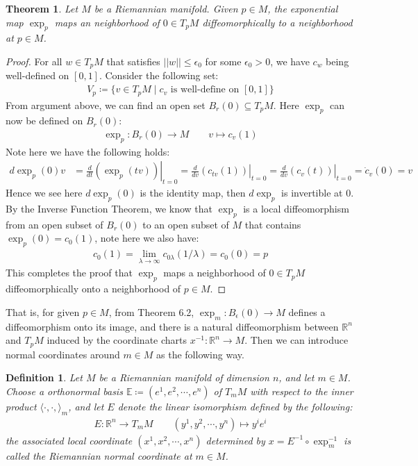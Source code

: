 \documentclass[11pt]{book}
\theoremstyle{break}
\theoremstyle{break}
\newtheorem{thm}{Theorem}[section]
\newtheorem{defn}{Definition}[corL]
\newcommand{\R}{\mathbb{R}}
\begin{document}
\begin{thm}
Let $M$ be a Riemannian manifold. Given $p \in M$, the exponential map $\exp_p$ maps an neighborhood of $0 \in T_pM$ diffeomorphically to a neighborhood at $p \in M$. 
\end{thm}
\begin{proof}
For all $w \in T_pM$ that satisfies $||w|| \leq \epsilon_0$ for some $\epsilon_0 >0$, we have $c_w$ being well-defined on $[0,1]$. Consider the following set:
\begin{align*}
V_p \coloneqq \{ v \in T_pM \mid c_v \text{ is well-define on }[0,1]\}
\end{align*}
From argument above, we can find an open set $B_r(0) \subseteq T_pM$. Here $\exp_p$ can now be defined on $B_r(0)$:
\begin{align*}
\exp_p:B_r(0) \to M \qquad v\mapsto c_v(1)
\end{align*}
Note here we have the following holds:
\begin{align}
d\exp_p(0)v &= \left.\frac{d}{dt}\left(\exp_p(tv)\right)\right|_{t=0} = \left.\frac{d}{dv}\left(c_{t v}(1)\right)\right|_{t=0} 
= \left.\frac{d}{dv}(c_v(t))\right|_{t=0} = \dot{c}_v(0) = v 
\end{align}
Hence we see here $d\exp_p(0)$ is the identity map, then $d\exp_p$ is invertible at $0$. By the Inverse Function Theorem, we know that $\exp_p$ is a local diffeomorphism from an open subset of $B_r(0)$ to an open subset of $M$ that contains $\exp_p(0) = c_0(1)$, note here we also have:
\begin{align*}
c_0(1) = \lim_{\lambda \to \infty}c_{0\lambda}(1/\lambda) = c_0(0) = p
\end{align*} 
This completes the proof that $\exp_p$ maps a neighborhood of $0 \in T_pM$ diffeomorphically onto a neighborhood of $p \in M$.
\end{proof}



That is, for given $p \in M$, from Theorem 6.2, $\exp_m:B_\epsilon(0)\to M$ defines a diffeomorphism onto its image, and there is a natural diffeomorphism between $\R^n$ and $T_pM$ induced by the coordinate charts $x^{-1}:\R^n \to M$. Then we can introduce normal coordinates around $m \in M$ as the following way. 

\begin{defn}
Let $M$ be a Riemannian manifold of dimension $n$, and let $m \in M$. Choose a orthonormal basis $\mathbb{E} \coloneqq (e^1,e^2,\cdots,e^n)$ of $T_mM$ with respect to the inner product $\langle \cdot, \cdot, \rangle_m$, and let $E$ denote the linear isomorphism defined by the following:
\begin{align*}
E:\R^n \to T_mM \qquad (y^1,y^2,\cdots,y^n)\mapsto y^i e^i
\end{align*} 
the associated local coordinate $(x^1,x^2,\cdots,x^n)$ determined by $x= E^{-1} \circ \exp_m^{-1}$ is called the Riemannian normal coordinate at $m\in M$.
\end{defn}
\end{document}
